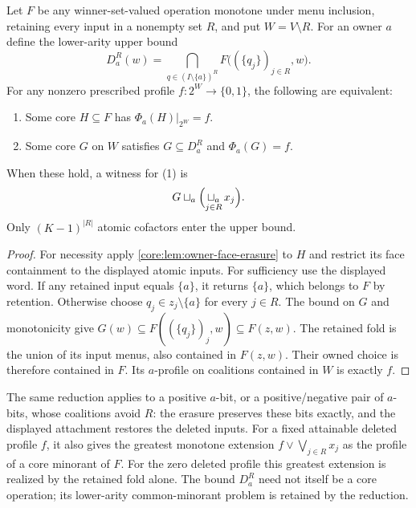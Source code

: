 \begin{theorem}
\label{core:thm:retained-profile-reduction}
Let $F$ be any winner-set-valued operation monotone under menu inclusion,
retaining every input in a nonempty set $R$, and put $W=V\setminus R$.
For an owner $a$ define the lower-arity upper bound
\[
 D_a^R(w)=
 \bigcap_{q\in(I\setminus\{a\})^R}
       F\bigl((\{q_j\})_{j\in R},w\bigr).
\]
For any nonzero prescribed profile $f:2^W\to\{0,1\}$, the following
are equivalent:
\begin{enumerate}
\item Some core $H\subseteq F$ has $\Phi_a(H)|_{2^W}=f$.
\item Some core $G$ on $W$ satisfies $G\subseteq D_a^R$ and
  $\Phi_a(G)=f$.
\end{enumerate}
When these hold, a witness for (1) is
\[
 G\star_a\Bigl(\mathop{\star_a}_{j\in R}x_j\Bigr).
\]
Only $(K-1)^{|R|}$ atomic cofactors enter the upper bound.
\end{theorem}
\begin{proof}
For necessity apply \cref{core:lem:owner-face-erasure} to $H$ and
restrict its face containment to the displayed atomic inputs.
For sufficiency use the displayed word. If any retained input equals
$\{a\}$, it returns $\{a\}$, which belongs to $F$ by retention.
Otherwise choose $q_j\in z_j\setminus\{a\}$ for every $j\in R$.
The bound on $G$ and monotonicity give
$G(w)\subseteq F((\{q_j\})_j,w)\subseteq F(z,w)$.
The retained fold is the union of its input menus, also contained in
$F(z,w)$. Their owned choice is therefore contained in $F$.
Its $a$-profile on coalitions contained in $W$ is exactly $f$.
\end{proof}

The same reduction applies to a positive $a$-bit, or a positive/negative
pair of $a$-bits, whose coalitions avoid $R$: the erasure preserves these
bits exactly, and the displayed attachment restores the deleted inputs.
For a fixed attainable deleted profile $f$, it also gives the greatest
monotone extension
$f\lor\bigvee_{j\in R}x_j$ as the profile of a core minorant of $F$.
For the zero deleted profile this greatest extension is realized by the
retained fold alone. The bound $D_a^R$ need not itself be a core operation;
its lower-arity common-minorant problem is retained by the reduction.



